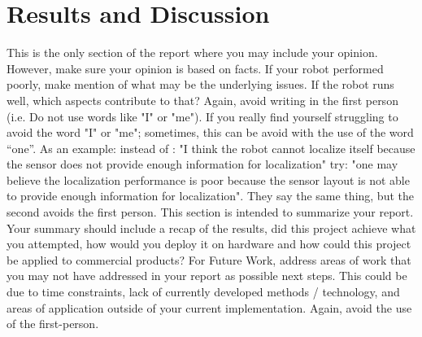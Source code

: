 \documentclass[10pt,journal,compsoc]{IEEEtran}
\begin{document}
     
    \section{Results and Discussion}
    This is the only section of the report where you may include your opinion. However, make sure your opinion is based on facts. If your robot performed poorly, make mention of what may be the underlying issues. If the robot runs well, which aspects contribute to that? Again, avoid writing in the first person (i.e. Do not use words like "I" or "me"). If you really find yourself struggling to avoid the word "I" or "me"; sometimes, this can be avoid with the use of the word “one”. As an example: instead of : "I think the robot cannot localize itself because the sensor does not provide enough information for localization" try: "one may believe the localization performance is poor because the sensor layout is not able to provide enough information for localization". They say the same thing, but the second avoids the first person. 
    This section is intended to summarize your report. Your summary should include a recap of the results, did this project achieve what you attempted, how would you deploy it on hardware and how could this project be applied to commercial products? 
    For Future Work, address areas of work that you may not have addressed in your report as possible next steps. This could be due to time constraints, lack of currently developed methods / technology, and areas of application outside of your current implementation. Again, avoid the use of the first-person.
    
    
    
    
    
    
\end{document}
